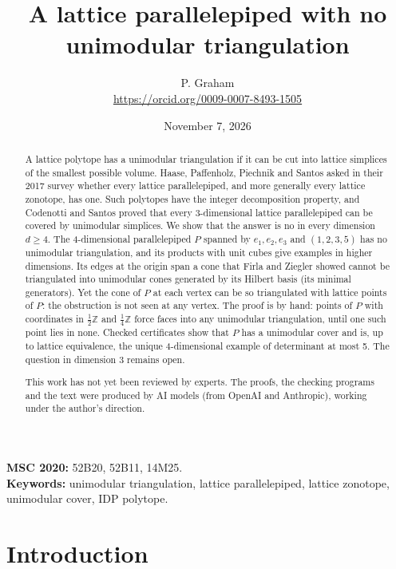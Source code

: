 \documentclass[11pt]{article}
\title{A lattice parallelepiped with no unimodular triangulation}
\author{P. Graham\\ \small\url{https://orcid.org/0009-0007-8493-1505}}
\date{November 7, 2026}
\theoremstyle{definition}
\newcommand{\Z}{\mathbb{Z}}
\begin{document}
\maketitle
\begin{abstract}
A lattice polytope has a unimodular triangulation if it can be cut into
lattice simplices of the smallest possible volume. Haase, Paffenholz,
Piechnik and Santos asked in their 2017 survey whether every lattice
parallelepiped, and more generally every lattice zonotope, has one. Such
polytopes have the integer decomposition property, and Codenotti and Santos
proved that every 3-dimensional lattice parallelepiped can be covered by
unimodular simplices. We show that the answer is no in every dimension $d\ge 4$.
The 4-dimensional parallelepiped $P$ spanned by $e_1,e_2,e_3$ and
$(1,2,3,5)$ has no unimodular triangulation, and its products with unit
cubes give examples in higher dimensions. Its edges at the origin span
a cone that Firla and Ziegler showed cannot be triangulated into unimodular
cones generated by its Hilbert basis (its minimal generators). Yet the
cone of $P$ at each vertex can be so triangulated with lattice points of
$P$: the obstruction is not seen at any vertex. The
proof is by hand: points of $P$ with coordinates in $\frac12\Z$ and
$\frac14\Z$ force faces into any unimodular triangulation, until one such
point lies in none. Checked certificates show that $P$ has a unimodular
cover and is, up to lattice equivalence, the unique 4-dimensional example of
determinant at most 5. The question in
dimension 3 remains open.

This work has not yet been reviewed by experts. The proofs, the checking programs and the text were produced by AI models (from OpenAI and Anthropic), working under the author's direction.
\end{abstract}
\medskip
\noindent\textbf{MSC 2020:} 52B20, 52B11, 14M25.\\
\textbf{Keywords:} unimodular triangulation, lattice parallelepiped, lattice zonotope, unimodular cover, IDP polytope.

\section{Introduction}
\end{document}

